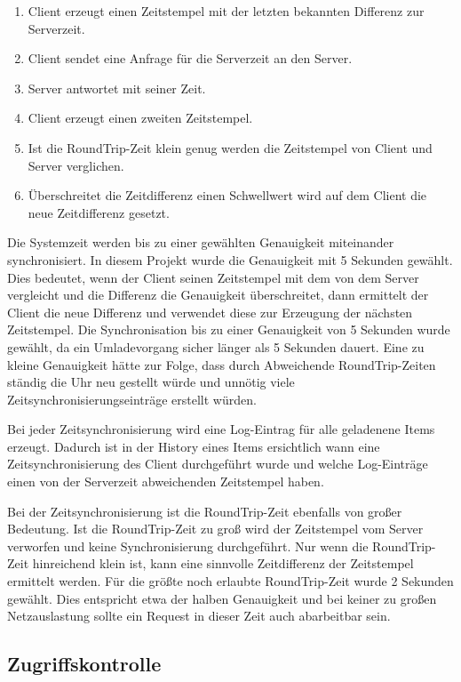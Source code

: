 \begin{enumerate}
	\item Client erzeugt einen Zeitstempel mit der letzten bekannten
		Differenz zur Serverzeit.
	\item Client sendet eine Anfrage für die Serverzeit an den Server.
	\item Server antwortet mit seiner Zeit.
	\item Client erzeugt einen zweiten Zeitstempel.
	\item Ist die RoundTrip-Zeit klein genug werden die Zeitstempel
		von Client und Server verglichen.
	\item Überschreitet die Zeitdifferenz einen Schwellwert wird auf
		dem Client die neue Zeitdifferenz gesetzt.
\end{enumerate}

Die Systemzeit werden bis zu einer gewählten Genauigkeit miteinander synchronisiert.
	In diesem Projekt wurde die Genauigkeit mit 5 Sekunden gewählt. Dies bedeutet,
	wenn der Client seinen Zeitstempel mit dem von dem Server vergleicht und die
	Differenz die Genauigkeit überschreitet, dann ermittelt der Client die neue
	Differenz und verwendet diese zur Erzeugung der nächsten Zeitstempel. Die
	Synchronisation bis zu einer Genauigkeit von 5 Sekunden wurde gewählt, da ein
	Umladevorgang sicher länger als 5 Sekunden dauert. Eine zu kleine Genauigkeit
	hätte zur Folge, dass durch Abweichende RoundTrip-Zeiten ständig die Uhr neu
	gestellt würde und unnötig viele Zeitsynchronisierungseinträge erstellt würden.
	
Bei jeder Zeitsynchronisierung wird eine Log-Eintrag für alle geladenene Items erzeugt.
	Dadurch ist in der History eines Items ersichtlich wann eine Zeitsynchronisierung
	des Client durchgeführt wurde und welche Log-Einträge einen von der Serverzeit
	abweichenden Zeitstempel haben.

Bei der Zeitsynchronisierung ist die RoundTrip-Zeit ebenfalls von großer Bedeutung.
	Ist die RoundTrip-Zeit zu groß wird der Zeitstempel vom Server verworfen und keine
	Synchronisierung durchgeführt. Nur wenn die RoundTrip-Zeit hinreichend klein ist,
	kann eine sinnvolle Zeitdifferenz der Zeitstempel ermittelt werden. Für die größte
	noch erlaubte RoundTrip-Zeit wurde 2 Sekunden gewählt. Dies entspricht etwa der halben
	Genauigkeit und bei keiner zu großen Netzauslastung sollte ein Request in dieser Zeit
	auch abarbeitbar sein.

\subsection{Zugriffskontrolle}

